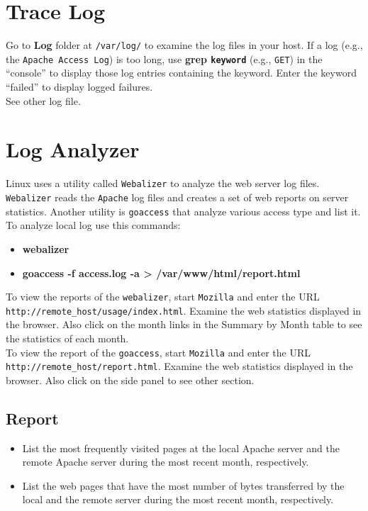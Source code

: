 \documentclass[10pt,a4paper]{article}
\numberwithin{equation}{section}
\numberwithin{figure}{section}
\numberwithin{table}{section}
\begin{document}
\section{Trace Log}
	Go to \textbf{Log} folder at \texttt{/var/log/} to examine the log files in your host. If a log (e.g., the \texttt{Apache Access Log}) is too long, use \textbf{grep \texttt{keyword}} (e.g., \texttt{GET}) in the “console” to display those log entries containing the keyword. Enter the keyword “failed” to display logged failures.\\
	See other log file.

\section{Log Analyzer}
	Linux uses a utility called \texttt{Webalizer} to analyze the web server log files. \texttt{Webalizer} reads the \texttt{Apache} log files and creates a set of web reports on server statistics. Another utility is \texttt{goaccess} that analyze various access type and list it.\\
	To analyze local log use this commands:
	\begin{itemize}
		\item \textbf{webalizer}
		\item \textbf{goaccess -f access.log -a > /var/www/html/report.html}
	\end{itemize}
	To view the reports of the \texttt{webalizer}, start \texttt{Mozilla} and enter the URL \texttt{http://remote\_host/usage/index.html}. Examine the web statistics displayed in the browser. Also click on the month links in the Summary by Month table to see the statistics of each month.\\
	To view the report of the \texttt{goaccess}, start \texttt{Mozilla} and enter the URL \texttt{http://remote\_host/report.html}. Examine the web statistics displayed in the browser. Also click on the side panel to see other section.

	\subsection*{Report}
	\begin{itemize}
		\item List the most frequently visited pages at the local Apache server and 		the remote Apache server during the most recent month, respectively.
		\item List the web pages that have the most number of bytes transferred by the local and the remote server during the most recent month, respectively.
	\end{itemize}
\end{document}
